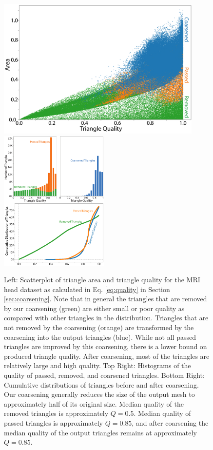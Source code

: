 \documentclass[10pt,journal,cspaper,compsoc]{IEEEtran}
\begin{document}
\begin{figure}[!tb]
\begin{center}
\includegraphics[height=7.05cm]{ScatterAll.png}
\hspace{0.1cm}
\includegraphics[height=7.05cm]{MergedFigures.pdf}
\caption{Left: Scatterplot of triangle area and triangle quality for the MRI head dataset as calculated in Eq. \ref{eq:quality} in Section \ref{sec:coarsening}. Note that in general the triangles that are removed by our coarsening (green) are either small or poor quality as compared with other triangles in the distribution. Triangles that are not removed by the coarsening (orange) are transformed by the coarsening into the output triangles (blue). While not all passed triangles are improved by this coarsening, there is a lower bound on produced triangle quality. After coarsening, most of the triangles are relatively large and high quality.
Top Right: Histograms of the quality of passed, removed, and coarsened triangles.
Bottom Right: Cumulative distributions of triangles before and after coarsening. Our coarsening generally reduces the size of the output mesh to approximately half of its original size. Median quality of the removed triangles is approximately $Q=0.5$. Median quality of passed triangles is approximately $Q=0.85$, and after coarsening the median quality of the output triangles remains at approximately $Q=0.85$.}
\label{fig:coarseninggraphs}
\end{center}
\end{figure}
\end{document}
